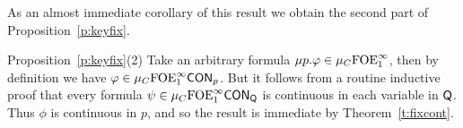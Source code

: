 \noindent
As an almost immediate corollary of this result we obtain the second part of 
Proposition~\ref{p:keyfix}.

\begin{proofof}{Proposition~\ref{p:keyfix}(2)}
Take an arbitrary formula $\mu p. \varphi \in \mu_{C}\mathrm{FOE}^{\infty}_1$, then by definition 
we have $\varphi \in \mu_{C}\mathrm{FOE}^{\infty}_1\mathsf{CON}_{p}$.
But it follows from a routine inductive proof that every formula $\psi \in 
\mu_{C}\mathrm{FOE}^{\infty}_1\mathsf{CON}_{\mathsf{Q}}$ is continuous in each variable in $\mathsf{Q}$.
Thus $\phi$ is continuous in $p$, and so the result is immediate by 
Theorem~\ref{t:fixcont}.
\end{proofof}


